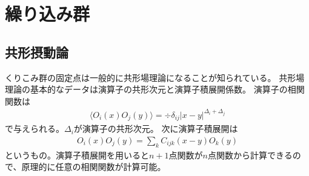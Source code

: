 \documentclass[12pt]{ltjsarticle}
\begin{document}

\section{繰り込み群}
\subsection*{共形摂動論}

くりこみ群の固定点は一般的に共形場理論になることが知られている。
共形場理論の基本的なデータは演算子の共形次元と演算子積展開係数。
演算子の相関関数は
\begin{align}
    ⟨O_i(x)O_j(y)⟩ = ÷{δ_{ij}}{|x-y|^{Δ_i+Δ_j}}
\end{align}
で与えられる。$Δ_i$が演算子の共形次元。
次に演算子積展開は
\begin{align}
    O_i(x)O_j(y) = ∑_{k} C_{ijk}(x-y)O_k(y)
\end{align}
というもの。演算子積展開を用いると$n+1$点関数が$n$点関数から計算できるので、原理的に任意の相関関数が計算可能。
\end{document}
